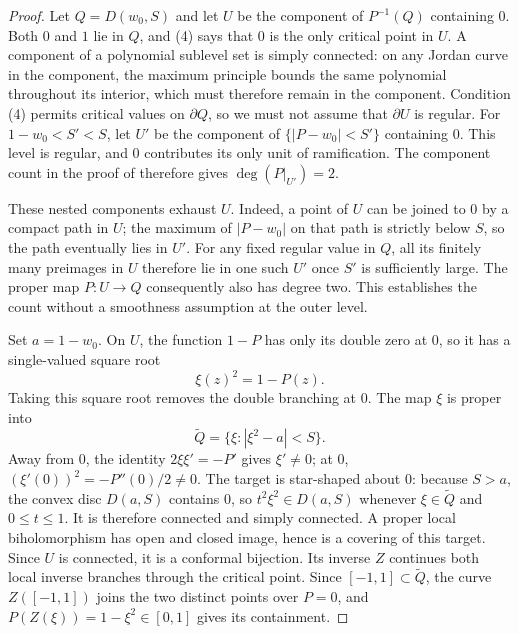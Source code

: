 \begin{proof}
Let $Q=D(w_0,S)$ and let $U$ be the component of $P^{-1}(Q)$ containing
$0$.  Both $0$ and $1$ lie in $Q$, and (4) says that $0$ is the only critical
point in $U$.  A component of a polynomial sublevel set is simply connected: on any
Jordan curve in the component, the maximum principle bounds the same
polynomial throughout its interior, which must therefore remain in the
component. Condition (4) permits critical values on $\partial Q$, so
we must not assume that $\partial U$ is regular. For $1-w_0<S'<S$,
let $U'$ be the component of $\{|P-w_0|<S'\}$ containing $0$.
This level is regular, and $0$ contributes its only unit of ramification.
The component count in the proof of \cite[Proposition~2.1]{eks2010}
therefore gives $\deg(P|_{U'})=2$.

These nested components exhaust $U$. Indeed, a point of $U$ can be
joined to $0$ by a compact path in $U$; the maximum of $|P-w_0|$ on
that path is strictly below $S$, so the path eventually lies in $U'$.
For any fixed regular value in $Q$, all its finitely many preimages in
$U$ therefore lie in one such $U'$ once $S'$ is sufficiently large.
The proper map $P:U\to Q$ consequently also has degree two. This
establishes the count without a smoothness assumption at the outer level.

Set $a=1-w_0$.  On $U$, the function $1-P$ has only its double zero at $0$,
so it has a single-valued square root
\[
 \xi(z)^2=1-P(z).
\]
Taking this square root removes the double branching at $0$.
The map $\xi$ is proper into
\[
 \widetilde Q=\{\xi:|\xi^2-a|<S\}.
\]
Away from $0$, the identity $2\xi\xi'=-P'$ gives $\xi'\ne0$;
at $0$, $(\xi'(0))^2=-P''(0)/2\ne0$. The target is star-shaped about
$0$: because $S>a$, the convex disc $D(a,S)$ contains $0$, so
$t^2\xi^2\in D(a,S)$ whenever $\xi\in\widetilde Q$ and $0\le t\le1$.
It is therefore connected and simply connected. A proper local
biholomorphism has open and closed image, hence is a covering of this
target. Since $U$ is connected, it is a conformal bijection. Its inverse
$Z$ continues both local inverse branches through the critical point.  Since $[-1,1]\subset\widetilde Q$, the
curve $Z([-1,1])$ joins the two distinct points over $P=0$, and
$P(Z(\xi))=1-\xi^2\in[0,1]$ gives its containment.


\end{proof}
